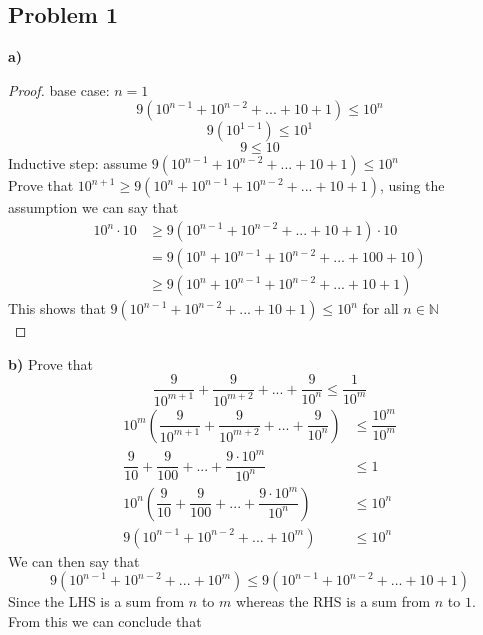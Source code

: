 \documentclass[12pt]{article}
\newcommand{\N}{\mathbb{N}}
\begin{document}
\subsection*{Problem 1}
\textbf{a) }
\begin{proof}
base case: $n = 1$
\[ 9(10^{n-1} + 10 ^{n-2} + ... + 10 + 1) \leq 10^n \]
\[ 9(10^{1-1}) \leq 10^1 \]
\[ 9 \leq 10 \]
Inductive step: assume $9(10^{n-1} + 10 ^{n-2} + ... + 10 + 1) \leq 10^n$\\
Prove that $10^{n+1} \geq 9(10^{n} + 10^{n-1} + 10^{n-2} + ... + 10 + 1)$, using the assumption we can say that
\begin{align*}
10^{n} \cdot 10 &\geq 9(10^{n-1} + 10 ^{n-2} + ... + 10 + 1) \cdot 10 \\
&= 9(10^n + 10^{n-1} + 10^{n-2} + ... + 100 + 10)\\
&\geq 9(10^n + 10^{n-1} + 10^{n-2} + ... + 10 + 1)
\end{align*}
This shows that $9(10^{n-1} + 10 ^{n-2} + ... + 10 + 1) \leq 10^n$ for all $n \in \N$ \\
\end{proof}
\textbf{b)} Prove that 
\[ \dfrac{9}{10^{m+1}} + \dfrac{9}{10^{m+2}} + ... + \dfrac{9}{10^{n}}  \leq \dfrac{1}{10^m} \]
\begin{align*}
10^m \left( \dfrac{9}{10^{m+1}} + \dfrac{9}{10^{m+2}} + ... + \dfrac{9}{10^{n}}  \right) &\leq \dfrac{10^m}{10^m} \\
\dfrac{9}{10} + \dfrac{9}{100} + ... + \dfrac{9 \cdot 10^m}{10^{n}} &\leq 1 \\
10^n \left( \dfrac{9}{10} + \dfrac{9}{100} + ... + \dfrac{9 \cdot 10^m}{10^{n}}  \right) &\leq 10^n \\
9( 10^{n-1} + 10^{n-2} + ... + 10^m ) &\leq 10^n
\end{align*}
We can then say that
\[ 9( 10^{n-1} + 10^{n-2} + ... + 10^m ) \leq  9(10^{n-1} + 10 ^{n-2} + ... + 10 + 1)\]
Since the LHS is a sum from $n$ to $m$ whereas the RHS is a sum from $n$ to $1$. From this we can conclude that 
\newpage
\end{document}

